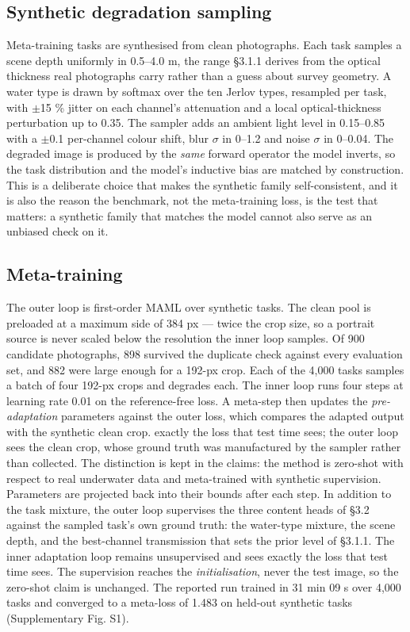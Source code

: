 \documentclass[journal]{IEEEtran}
\begin{document}
\subsection{Synthetic degradation sampling}
Meta-training tasks are synthesised from clean photographs. Each task samples a scene depth uniformly in 0.5--4.0 m, the range \S{}3.1.1 derives from the optical thickness real photographs carry rather than a guess about survey geometry. A water type is drawn by softmax over the ten Jerlov types, resampled per task, with $\pm$15 \% jitter on each channel's attenuation and a local optical-thickness perturbation up to 0.35. The sampler adds an ambient light level in 0.15--0.85 with a $\pm$0.1 per-channel colour shift, blur $\sigma$ in 0--1.2 and noise $\sigma$ in 0--0.04. The degraded image is produced by the \emph{same} forward operator the model inverts, so the task distribution and the model's inductive bias are matched by construction. This is a deliberate choice that makes the synthetic family self-consistent, and it is also the reason the benchmark, not the meta-training loss, is the test that matters: a synthetic family that matches the model cannot also serve as an unbiased check on it.

\subsection{Meta-training}
The outer loop is first-order MAML \cite{finn2017maml} over synthetic tasks. The clean pool is preloaded at a maximum side of 384 px --- twice the crop size, so a portrait source is never scaled below the resolution the inner loop samples. Of 900 candidate photographs, 898 survived the duplicate check against every evaluation set, and 882 were large enough for a 192-px crop. Each of the 4,000 tasks samples a batch of four 192-px crops and degrades each. The inner loop runs four steps at learning rate 0.01 on the reference-free loss. A meta-step then updates the \emph{pre-adaptation} parameters against the outer loss, which compares the adapted output with the synthetic clean crop. exactly the loss that test time sees; the outer loop sees the clean crop, whose ground truth was manufactured by the sampler rather than collected. The distinction is kept in the claims: the method is zero-shot with respect to real underwater data and meta-trained with synthetic supervision. Parameters are projected back into their bounds after each step. In addition to the task mixture, the outer loop supervises the three content heads of \S{}3.2 against the sampled task's own ground truth: the water-type mixture, the scene depth, and the best-channel transmission that sets the prior level of \S{}3.1.1. The inner adaptation loop remains unsupervised and sees exactly the loss that test time sees. The supervision reaches the \emph{initialisation}, never the test image, so the zero-shot claim is unchanged. The reported run trained in 31 min 09 s over 4,000 tasks and converged to a meta-loss of 1.483 on held-out synthetic tasks (Supplementary Fig. S1).
\end{document}
